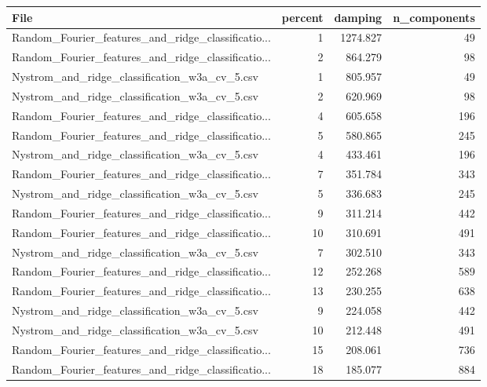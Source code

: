 \begin{tabularx}{\textwidth}{lrrr}
\toprule
                                              File &  percent &  damping &  n\_components \\
\midrule
Random\_Fourier\_features\_and\_ridge\_classificatio... &        1 & 1274.827 &            49 \\
Random\_Fourier\_features\_and\_ridge\_classificatio... &        2 &  864.279 &            98 \\
     Nystrom\_and\_ridge\_classification\_w3a\_cv\_5.csv &        1 &  805.957 &            49 \\
     Nystrom\_and\_ridge\_classification\_w3a\_cv\_5.csv &        2 &  620.969 &            98 \\
Random\_Fourier\_features\_and\_ridge\_classificatio... &        4 &  605.658 &           196 \\
Random\_Fourier\_features\_and\_ridge\_classificatio... &        5 &  580.865 &           245 \\
     Nystrom\_and\_ridge\_classification\_w3a\_cv\_5.csv &        4 &  433.461 &           196 \\
Random\_Fourier\_features\_and\_ridge\_classificatio... &        7 &  351.784 &           343 \\
     Nystrom\_and\_ridge\_classification\_w3a\_cv\_5.csv &        5 &  336.683 &           245 \\
Random\_Fourier\_features\_and\_ridge\_classificatio... &        9 &  311.214 &           442 \\
Random\_Fourier\_features\_and\_ridge\_classificatio... &       10 &  310.691 &           491 \\
     Nystrom\_and\_ridge\_classification\_w3a\_cv\_5.csv &        7 &  302.510 &           343 \\
Random\_Fourier\_features\_and\_ridge\_classificatio... &       12 &  252.268 &           589 \\
Random\_Fourier\_features\_and\_ridge\_classificatio... &       13 &  230.255 &           638 \\
     Nystrom\_and\_ridge\_classification\_w3a\_cv\_5.csv &        9 &  224.058 &           442 \\
     Nystrom\_and\_ridge\_classification\_w3a\_cv\_5.csv &       10 &  212.448 &           491 \\
Random\_Fourier\_features\_and\_ridge\_classificatio... &       15 &  208.061 &           736 \\
Random\_Fourier\_features\_and\_ridge\_classificatio... &       18 &  185.077 &           884 \\

\end{tabularx}
